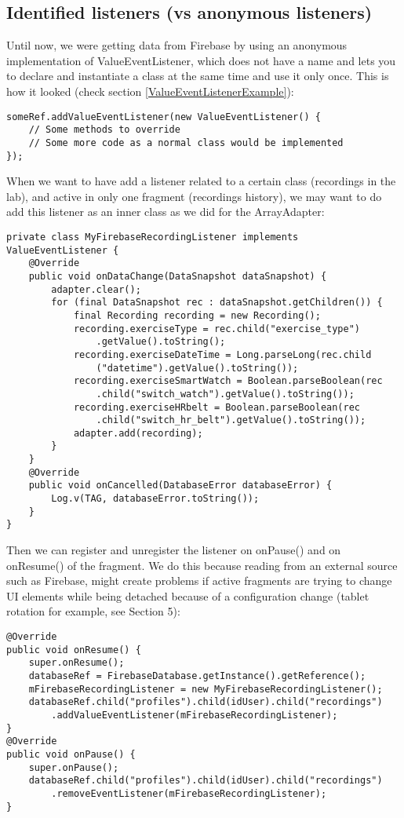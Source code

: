 \documentclass[11pt]{article}
\begin{document}
\subsection{Identified listeners (vs anonymous listeners)}
Until now, we were getting data from Firebase by using an anonymous implementation of ValueEventListener, which does not have a name and lets you to declare and instantiate a class at the same time and use it only once. This is how it looked (check section \ref{ValueEventListenerExample}):
\begin{lstlisting}
someRef.addValueEventListener(new ValueEventListener() {
    // Some methods to override
    // Some more code as a normal class would be implemented
});
\end{lstlisting}
When we want to have add a listener related to a certain class (recordings in the lab), and active in only one fragment (recordings history), we may want to do add this listener as an inner class as we did for the ArrayAdapter: 
\begin{lstlisting}
private class MyFirebaseRecordingListener implements ValueEventListener {
    @Override
    public void onDataChange(DataSnapshot dataSnapshot) {
        adapter.clear();
        for (final DataSnapshot rec : dataSnapshot.getChildren()) {
            final Recording recording = new Recording();
            recording.exerciseType = rec.child("exercise_type")
                .getValue().toString();
            recording.exerciseDateTime = Long.parseLong(rec.child
                ("datetime").getValue().toString());
            recording.exerciseSmartWatch = Boolean.parseBoolean(rec
                .child("switch_watch").getValue().toString());
            recording.exerciseHRbelt = Boolean.parseBoolean(rec
                .child("switch_hr_belt").getValue().toString());
            adapter.add(recording);
        }
    }
    @Override
    public void onCancelled(DatabaseError databaseError) {
        Log.v(TAG, databaseError.toString());
    }
}
\end{lstlisting}
Then we can register and unregister the listener on onPause() and on onResume() of the fragment. We do this because reading from an external source such as Firebase, might create problems if active fragments are trying to change UI elements while being detached because of a configuration change (tablet rotation for example, see Section 5):
\begin{lstlisting}
@Override
public void onResume() {
    super.onResume();
    databaseRef = FirebaseDatabase.getInstance().getReference();
    mFirebaseRecordingListener = new MyFirebaseRecordingListener();
    databaseRef.child("profiles").child(idUser).child("recordings")
        .addValueEventListener(mFirebaseRecordingListener);
}
@Override
public void onPause() {
    super.onPause();
    databaseRef.child("profiles").child(idUser).child("recordings")
        .removeEventListener(mFirebaseRecordingListener);
}
\end{lstlisting}
\end{document}
